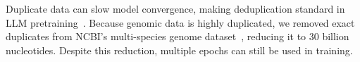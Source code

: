 Duplicate data can slow model convergence, making deduplication standard in LLM pretraining~\cite{rae2021scaling, groeneveld2024olmo}. Because genomic data is highly duplicated, we removed exact duplicates from NCBI's  multi-species genome dataset~\cite{schoch2020ncbi}, reducing it to 30 billion nucleotides. Despite this reduction, multiple epochs can still be used in training.



